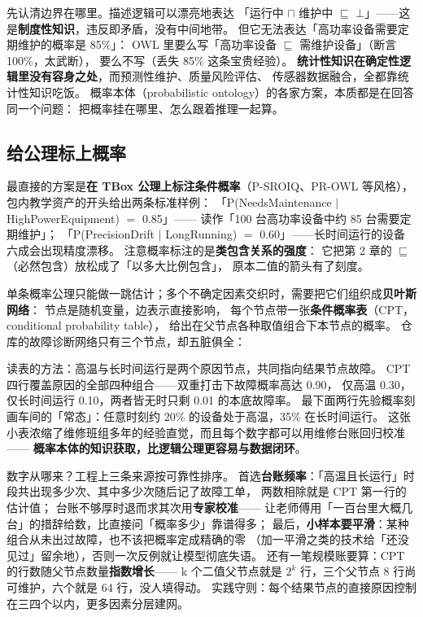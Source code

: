 先认清边界在哪里。描述逻辑可以漂亮地表达
「运行中 \(\sqcap\) 维护中 \(\sqsubseteq\) \(\bot\)」——这是\textbf{制度性知识}，违反即矛盾，没有中间地带。
但它无法表达「高功率设备需要定期维护的概率是 85\%」：
OWL 里要么写「高功率设备 \(\sqsubseteq\) 需维护设备」（断言 100\%，太武断），
要么不写（丢失 85\% 这条宝贵经验）。
\textbf{统计性知识在确定性逻辑里没有容身之处}，而预测性维护、质量风险评估、
传感器数据融合，全都靠统计性知识吃饭。
概率本体（probabilistic ontology）的各家方案，本质都是在回答同一个问题：
把概率挂在哪里、怎么跟着推理一起算。

\subsection{给公理标上概率}

最直接的方案是\textbf{在 TBox 公理上标注条件概率}（P-SROIQ、PR-OWL 等风格），
包内教学资产的开头给出两条标准样例：
「P(NeedsMaintenance \(\mid\) HighPowerEquipment) \(=\) 0.85」——
读作「100 台高功率设备中约 85 台需要定期维护」；
「P(PrecisionDrift \(\mid\) LongRunning) \(=\) 0.60」——长时间运行的设备六成会出现精度漂移。
注意概率标注的是\textbf{类包含关系的强度}：
它把第 2 章的 \(\sqsubseteq\)（必然包含）放松成了「以多大比例包含」，
原本二值的箭头有了刻度。

单条概率公理只能做一跳估计；多个不确定因素交织时，需要把它们组织成\textbf{贝叶斯网络}：
节点是随机变量，边表示直接影响，
每个节点带一张\textbf{条件概率表}（CPT，conditional probability table），
给出在父节点各种取值组合下本节点的概率。
仓库的故障诊断网络只有三个节点，却五脏俱全：



读表的方法：高温与长时间运行是两个原因节点，共同指向结果节点故障。
CPT 四行覆盖原因的全部四种组合——双重打击下故障概率高达 0.90，
仅高温 0.30，仅长时间运行 0.10，两者皆无时只剩 0.01 的本底故障率。
最下面两行先验概率刻画车间的「常态」：任意时刻约 20\% 的设备处于高温，35\% 在长时间运行。
这张小表浓缩了维修班组多年的经验直觉，而且每个数字都可以用维修台账回归校准——
\textbf{概率本体的知识获取，比逻辑公理更容易与数据闭环}。

数字从哪来？工程上三条来源按可靠性排序。
首选\textbf{台账频率}：「高温且长运行」时段共出现多少次、其中多少次随后记了故障工单，
两数相除就是 CPT 第一行的估计值；
台账不够厚时退而求其次用\textbf{专家校准}——
让老师傅用「一百台里大概几台」的措辞给数，比直接问「概率多少」靠谱得多；
最后，\textbf{小样本要平滑}：某种组合从未出过故障，也不该把概率定成精确的零
（加一平滑之类的技术给「还没见过」留余地），否则一次反例就让模型彻底失语。
还有一笔规模账要算：CPT 的行数随父节点数量\textbf{指数增长}——
k 个二值父节点就是 \(2^{k}\) 行，三个父节点 8 行尚可维护，六个就是 64 行，没人填得动。
实践守则：每个结果节点的直接原因控制在三四个以内，更多因素分层建网。

